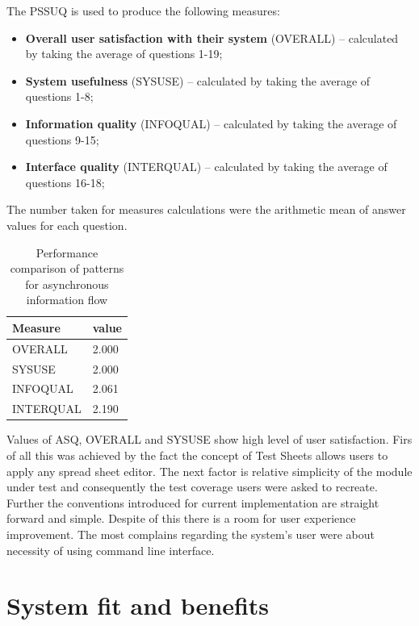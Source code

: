The PSSUQ is used to produce the following measures:
\begin{itemize}
	\item \textbf{Overall user satisfaction with their system} (OVERALL) – calculated by taking the average of questions 1-19;
	\item  \textbf{System usefulness} (SYSUSE) – calculated by taking the average of questions 1-8;
	\item \textbf{Information quality} (INFOQUAL) – calculated by taking the average of questions 9-15;
	\item \textbf{Interface quality} (INTERQUAL) – calculated by taking the average of questions 16-18;
\end{itemize}

The number taken for measures calculations were the arithmetic mean of answer values for each question.
\begin{table}[h]
	\begin{center}
		\begin{tabular}{| l | l |  }
			\hline
			\textbf{Measure} & \textbf{value} \\
			\hline
			OVERALL & 2.000  \\
			\hline
			SYSUSE & 2.000  \\
			\hline
			INFOQUAL & 2.061 \\
			\hline
			INTERQUAL & 2.190 \\
			\hline
		\end{tabular}
	\end{center}
	\caption{Performance comparison of patterns for asynchronous information flow}
\end{table}

Values of ASQ, OVERALL and SYSUSE show high level of user satisfaction.
Firs of all this was achieved by the fact the concept of Test Sheets allows users to apply any spread sheet editor. The next factor is relative simplicity of the module under test and consequently the test coverage users were asked to recreate. Further the conventions introduced for current implementation are straight forward and simple. Despite of this there is a room for user experience improvement. The most complains regarding the system's user were about necessity of using command line interface.

\chapter{System fit and benefits}
\label{chap:fitsBenefits}

